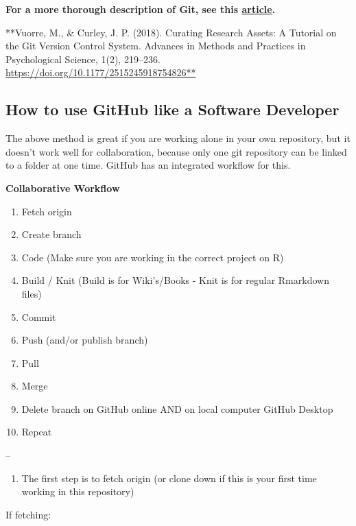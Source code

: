 \documentclass[]{book}
\providecommand{\tightlist}{%
  \setlength{\itemsep}{0pt}\setlength{\parskip}{0pt}}
\begin{document}
\textbf{For a more thorough description of Git, see this
\href{https://vuorre.netlify.app/publication/2018/06/01/curating-research-assets-a-tutorial-on-the-git-version-control-system/vuorre-curating-research-assets-2018.pdf}{article}.}

**Vuorre, M., \& Curley, J. P. (2018). Curating Research Assets: A
Tutorial on the Git Version Control System. Advances in Methods and
Practices in Psychological Science, 1(2), 219--236.
\url{https://doi.org/10.1177/2515245918754826**}

\subsection{How to use GitHub like a Software
Developer}\label{how-to-use-github-like-a-software-developer}

The above method is great if you are working alone in your own
repository, but it doesn't work well for collaboration, because only one
git repository can be linked to a folder at one time. GitHub has an
integrated workflow for this.

\textbf{Collaborative Workflow}

\begin{enumerate}
\def\labelenumi{\arabic{enumi}.}
\tightlist
\item
  Fetch origin
\item
  Create branch
\item
  Code (Make sure you are working in the correct project on R)
\item
  Build / Knit (Build is for Wiki's/Books - Knit is for regular
  Rmarkdown files)
\item
  Commit
\item
  Push (and/or publish branch)
\item
  Pull
\item
  Merge
\item
  Delete branch on GitHub online AND on local computer GitHub Desktop
\item
  Repeat
\end{enumerate}

--

\begin{enumerate}
\def\labelenumi{\arabic{enumi}.}
\tightlist
\item
  The first step is to fetch origin (or clone down if this is your first
  time working in this repository)
\end{enumerate}

If fetching:
\end{document}

